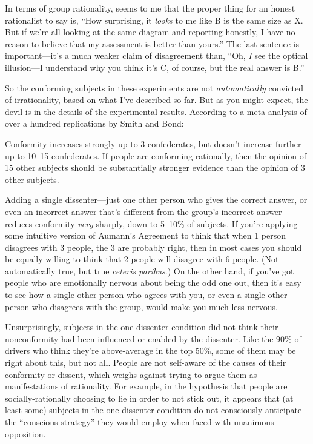 {
 In terms of group rationality, seems to me that the proper thing
for an honest rationalist to say is, ``How surprising,
it \textit{looks} to me like B is the same size as X. But if
we're all looking at the same diagram and reporting
honestly, I have no reason to believe that my assessment is better than
yours.'' The last sentence is
important---it's a much weaker claim of disagreement
than, ``Oh, \textit{I} see the optical illusion---I
understand why you think it's C, of course, but the
real answer is B.''}

{
 So the conforming subjects in these experiments are not
\textit{automatically} convicted of irrationality, based on what
I've described so far. But as you might expect, the
devil is in the details of the experimental results. According to a
meta-analysis of over a hundred replications by Smith and
Bond:}

{
 Conformity increases strongly up to 3 confederates, but
doesn't increase further up to 10--15 confederates. If
people are conforming rationally, then the opinion of 15 other subjects
should be substantially stronger evidence than the opinion of 3 other
subjects.}

{
 Adding a single dissenter---just one other person who gives the
correct answer, or even an incorrect answer that's
different from the group's incorrect answer---reduces
conformity \textit{very} sharply, down to 5--10\% of subjects. If
you're applying some intuitive version of
Aumann's Agreement to think that when 1 person
disagrees with 3 people, the 3 are probably right, then in most cases
you should be equally willing to think that 2 people will disagree with
6 people. (Not automatically true, but true \textit{ceteris paribus}.)
On the other hand, if you've got people who are
emotionally nervous about being the odd one out, then
it's easy to see how a single other person who agrees
with you, or even a single other person who disagrees with the group,
would make you much less nervous.}

{
 Unsurprisingly, subjects in the one-dissenter condition did not
think their nonconformity had been influenced or enabled by the
dissenter. Like the 90\% of drivers who think they're
above-average in the top 50\%, some of them may be right about this,
but not all. People are not self-aware of the causes of their
conformity or dissent, which weighs against trying to argue them as
manifestations of rationality. For example, in the hypothesis that
people are socially-rationally choosing to lie in order to not stick
out, it appears that (at least some) subjects in the one-dissenter
condition do not consciously anticipate the
``conscious strategy'' they would
employ when faced with unanimous opposition.}

